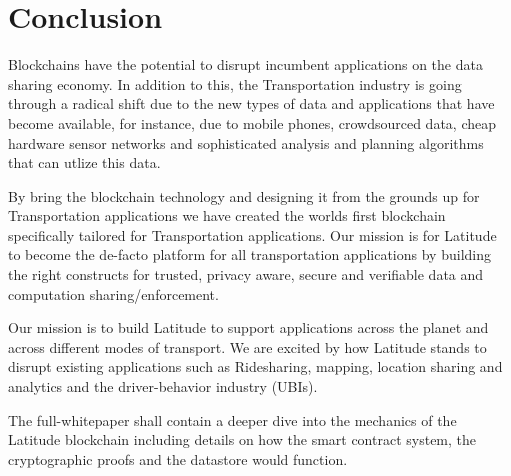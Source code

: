 \section{Conclusion}
\label{sec:conc}

Blockchains have the potential to disrupt incumbent applications on the data sharing economy. In addition to this, the
Transportation industry is going through a radical shift due to the new types of data and applications that have become
available, for instance, due to mobile phones, crowdsourced data, cheap hardware sensor networks and sophisticated
analysis and planning algorithms that can utlize this data.

By bring the blockchain technology and designing it from the grounds up for Transportation applications we have created
the worlds first blockchain specifically tailored for Transportation applications. Our mission is for Latitude to become
the de-facto platform for all transportation applications by building the right constructs for trusted, privacy aware,
secure and verifiable data and computation sharing/enforcement.

Our mission is to build Latitude to support applications across the planet and across different modes of transport. We
are excited by how Latitude stands to disrupt existing applications such as Ridesharing, mapping, location sharing and
analytics and the driver-behavior industry (UBIs).

The full-whitepaper shall contain a deeper dive into the mechanics of the Latitude blockchain including details on how
the smart contract system, the cryptographic proofs and the datastore would function.
